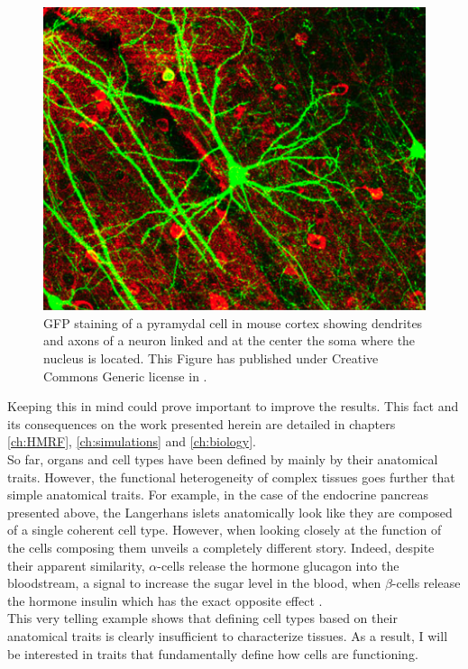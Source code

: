 \begin{figure}[bth]
\begin{center}
  \includegraphics[width=0.8\linewidth]{gfx/chapter1/neuron.png}
\end{center}
  \caption{GFP staining of a pyramydal cell in mouse cortex showing dendrites and axons of a neuron linked and at the center the soma where the nucleus is located. This Figure has published under Creative Commons Generic license in \cite{lee06}.}
  \label{fig:neuron}
\end{figure}
	
     Keeping this in mind could prove important to improve the results. This fact and its consequences on the work presented herein are detailed in chapters \ref{ch:HMRF}, \ref{ch:simulations} and \ref{ch:biology}.\\
     
     So far, organs and cell types have been defined by mainly by their anatomical traits. However, the functional heterogeneity of complex tissues goes further that simple anatomical traits. For example, in the case of the endocrine pancreas presented above, the Langerhans islets anatomically look like they are composed of a single coherent cell type. However, when looking closely at the function of the cells composing them unveils a completely different story. Indeed, despite their apparent similarity, $\alpha$-cells release the hormone glucagon into the bloodstream, a signal to increase the sugar level in the blood, when $\beta$-cells release the hormone insulin which has the exact opposite effect \cite{costanzo06}.\\
     
     This very telling example shows that defining cell types based on their anatomical traits is clearly insufficient to characterize tissues.  As a result, I will be interested in traits that fundamentally define how cells are functioning.

